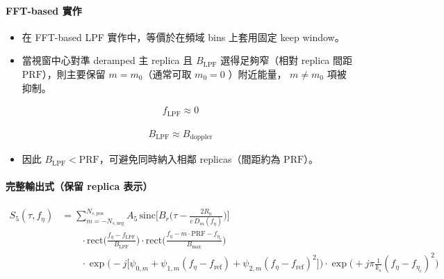 \documentclass[10pt]{article}
\providecommand{\tightlist}{%
  \setlength{\itemsep}{0pt}\setlength{\parskip}{0pt}}
\begin{document}
\hypertarget{fft-based-ux5be6ux4f5c}{%
\paragraph{FFT-based 實作}\label{fft-based-ux5be6ux4f5c}}

\begin{itemize}
\tightlist
\item
  在 FFT-based LPF 實作中，等價於在頻域 bins 上套用固定 keep window。
\item
  當視窗中心對準 deramped 主 replica 且 \(B_{\mathrm{LPF}}\)
  選得足夠窄（相對 replica 間距 \(\mathrm{PRF}\)），則主要保留
  \(m=m_0\)（通常可取 \(m_0=0\) ）附近能量， \(m\neq m_0\) 項被抑制。
\end{itemize}

\begin{equation}
\begin{aligned}
f_{\mathrm{LPF}}\approx 0
\end{aligned}
\end{equation}

\begin{equation}
\begin{aligned}
B_{\mathrm{LPF}}\approx B_{\mathrm{doppler}}
\end{aligned}
\end{equation}

\begin{itemize}
\tightlist
\item
  因此 \(B_{\mathrm{LPF}}<\mathrm{PRF}\)，可避免同時納入相鄰
  replicas（間距約為 \(\mathrm{PRF}\)）。
\end{itemize}

\hypertarget{ux5b8cux6574ux8f38ux51faux5f0fux4fddux7559-replica-ux8868ux793a}{%
\paragraph{完整輸出式（保留 replica
表示）}\label{ux5b8cux6574ux8f38ux51faux5f0fux4fddux7559-replica-ux8868ux793a}}

\begin{equation}
\begin{aligned}
S_5(\tau,f_\eta)
&=
\sum_{m=-N_{s,\mathrm{neg}}}^{N_{s,\mathrm{pos}}} A_5\,
\mathrm{sinc}\biggl[ B_r\biggl( \tau-\frac{2R_0}{c\,D_m(f_\eta)} \biggr) \biggr]\\
&\qquad \cdot \mathrm{rect}\biggl( \frac{f_\eta-f_{\mathrm{LPF}}}{B_{\mathrm{LPF}}} \biggr)
\cdot \mathrm{rect}\biggl( \frac{f_\eta-m\cdot\mathrm{PRF}-f_{\eta_c}}{B_{\max}} \biggr)\\
&\qquad \cdot \exp\biggl( -j\biggl[ \psi_{0,m}+\psi_{1,m}(f_\eta-f_{\mathrm{ref}})+\psi_{2,m}(f_\eta-f_{\mathrm{ref}})^2 \biggr] \biggr)
\cdot \exp\biggl( +j\pi\frac{1}{k_s}(f_\eta-f_{\eta_c})^2 \biggr)
\end{aligned}
\end{equation}
\end{document}
